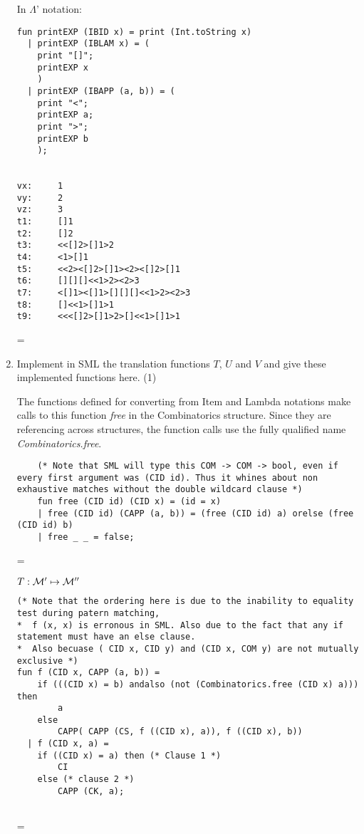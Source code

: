 \documentclass[11pt]{article}
\newenvironment{neverbreak} %
{\par\nobreak\vfil\penalty0\vfilneg
	\vtop\bgroup}
{\par\xdef\tpd{\the\prevdepth}\egroup
	\prevdepth=\tpd}
\begin{document}
\begin{enumerate}
\vspace{1cm}
\begin{neverbreak}
	In $\Lambda$' notation:
	\begin{verbatim}
fun printEXP (IBID x) = print (Int.toString x)
  | printEXP (IBLAM x) = (
	print "[]";
	printEXP x
	)
  | printEXP (IBAPP (a, b)) = (
	print "<";
	printEXP a;
	print ">";
	printEXP b
	);


vx:     1
vy:     2
vz:     3
t1:     []1
t2:     []2
t3:     <<[]2>[]1>2
t4:     <1>[]1
t5:     <<2><[]2>[]1><2><[]2>[]1
t6:     [][][]<<1>2><2>3
t7:     <[]1><[]1>[][][]<<1>2><2>3
t8:     []<<1>[]1>1
t9:     <<<[]2>[]1>2>[]<<1>[]1>1
	\end{verbatim}
\end{neverbreak}

\pagebreak
\item
Implement in SML the translation functions $T$, $U$ and $V$ and give these implemented functions here.
\hfill{(1)}\\ %

\begin{neverbreak}
	The functions defined for converting from Item and Lambda notations make calls to this function \textit{free} in the Combinatorics structure. Since they are referencing across structures, the function calls use the fully qualified name \textit{Combinatorics.free}.
	\begin{verbatim}
	(* Note that SML will type this COM -> COM -> bool, even if every first argument was (CID id). Thus it whines about non exhaustive matches without the double wildcard clause *)
	fun free (CID id) (CID x) = (id = x)
	| free (CID id) (CAPP (a, b)) = (free (CID id) a) orelse (free (CID id) b) 
	| free _ _ = false;
	\end{verbatim}
\end{neverbreak}

\begin{neverbreak}
	$T:{\cal M}'\mapsto {\cal M}''$\\
	\begin{verbatim}
(* Note that the ordering here is due to the inability to equality test during patern matching, 
*  f (x, x) is erronous in SML. Also due to the fact that any if statement must have an else clause. 
*  Also becuase ( CID x, CID y) and (CID x, COM y) are not mutually exclusive *)
fun f (CID x, CAPP (a, b)) = 
	if (((CID x) = b) andalso (not (Combinatorics.free (CID x) a))) then
		a
	else
		CAPP( CAPP (CS, f ((CID x), a)), f ((CID x), b))
  | f (CID x, a) =
	if ((CID x) = a) then (* Clause 1 *)
		CI 
	else (* clause 2 *)
		CAPP (CK, a);


\end{verbatim}
\end{neverbreak}
\end{enumerate}
\end{document}
